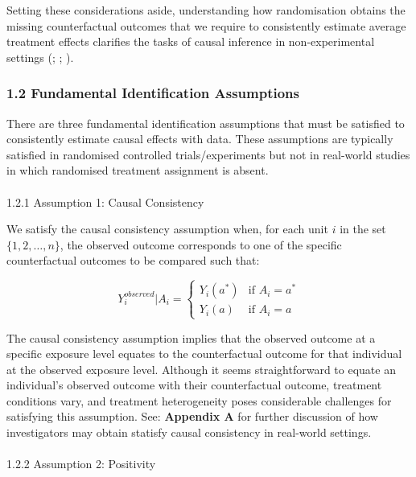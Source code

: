 \documentclass[
  single column]{article}
\makeatletter
\let\oldparagraph\paragraph
\renewcommand{\paragraph}{
    \@ifstar
      \xxxParagraphStar
      \xxxParagraphNoStar
  }
\newcommand{\xxxParagraphStar}[1]{\oldparagraph*{#1}\mbox{}}
\newcommand{\xxxParagraphNoStar}[1]{\oldparagraph{#1}\mbox{}}
\makeatother
\begin{document}
Setting these considerations aside, understanding how randomisation
obtains the missing counterfactual outcomes that we require to
consistently estimate average treatment effects clarifies the tasks of
causal inference in non-experimental settings
(;
;
).

\subsubsection{1.2 Fundamental Identification
Assumptions}\label{fundamental-identification-assumptions}

There are three fundamental identification assumptions that must be
satisfied to consistently estimate causal effects with data. These
assumptions are typically satisfied in randomised controlled
trials/experiments but not in real-world studies in which randomised
treatment assignment is absent.

\paragraph{1.2.1 Assumption 1: Causal
Consistency}\label{assumption-1-causal-consistency}

We satisfy the causal consistency assumption when, for each unit \(i\)
in the set \(\{1, 2, \ldots, n\}\), the observed outcome corresponds to
one of the specific counterfactual outcomes to be compared such that:

\[
Y_i^{observed}|A_i = 
\begin{cases} 
Y_i(a^*) & \text{if } A_i = a^* \\
Y_i(a) & \text{if } A_i = a
\end{cases}
\]

The causal consistency assumption implies that the observed outcome at a
specific exposure level equates to the counterfactual outcome for that
individual at the observed exposure level. Although it seems
straightforward to equate an individual's observed outcome with their
counterfactual outcome, treatment conditions vary, and treatment
heterogeneity poses considerable challenges for satisfying this
assumption. See: \textbf{Appendix A} for further discussion of how
investigators may obtain statisfy causal consistency in real-world
settings.

\paragraph{1.2.2 Assumption 2:
Positivity}\label{assumption-2-positivity}
\end{document}
